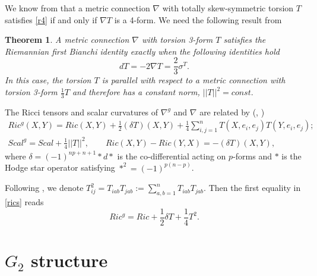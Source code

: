 \documentclass[10pt,british]{article}
\newtheorem{thrm}{Theorem}[section]
\def\sb {{\nabla}}
\def\LC{{\nabla^g}}
\begin{document}
We know from  \cite[Corollary~3.4]{I} that a metric connection $\sb$ with totally skew-symmetric torsion $T$ satisfies 
\eqref{r4}  if and only if  $\sb T$ is a 4-form.  
 We  need the following  result from \cite{IS}
\begin{thrm} \cite[Theorem~1.2]{IS}\label{tFBI}
A metric connection $\sb$ with torsion 3-form $T$ satisfies the Riemannian first Bianchi identity exactly when the following identities hold 
\begin{equation*}%
dT=-2\nabla T=\frac23\sigma^T.
\end{equation*}
In this case, the torsion  $T$ is parallel with respect to a metric connection with torsion 3-form $\frac13T$ \cite{AF} and therefore has a constant norm, $||T||^2=const.$
\end{thrm}
\noindent The   Ricci tensors and scalar curvatures of  $\LC$ and $\sb$ are related by (\cite[Section~2]{FI}, \cite [Prop. 3.18]{GFS})
\begin{equation}\label{rics}
\begin{split}
Ric^g(X,Y)=Ric(X,Y)+\frac12 (\delta T)(X,Y)+\frac14\sum_{i,j=1}^nT(X,e_i,e_j)T(Y,e_i,e_j);\\
Scal^g=Scal+\frac14||T||^2,\qquad Ric(X,Y)-Ric(Y,X)=-(\delta T)(X,Y),
\end{split}
\end{equation}
where $\delta=(-1)^{np+n+1}*d*$ is the co-differential acting on $p$-forms and $*$ is the Hodge star operator satisfying $*^2=(-1)^{p(n-p)}$.

Following \cite{GFS}, we denote 
$T^2_{ij}=T_{iab}T_{jab}:=\sum_{a,b=1}^nT_{iab}T_{jab}.$
Then the first equality in \eqref{rics} reads
$$Ric^g=Ric+\frac12\delta T+\frac14T^2.$$




\section{$G_2$ structure}
\end{document}
